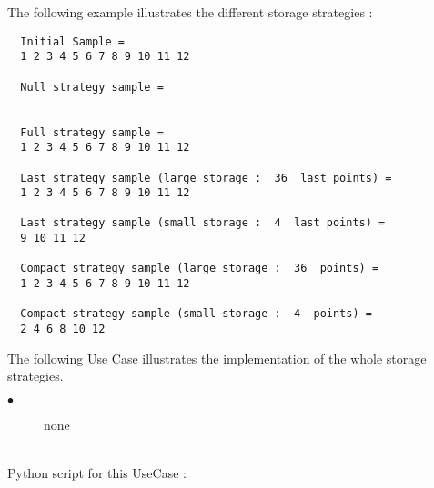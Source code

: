 The following example illustrates the different storage strategies :

\begin{verbatim}
  Initial Sample =
  1 2 3 4 5 6 7 8 9 10 11 12

  Null strategy sample =


  Full strategy sample =
  1 2 3 4 5 6 7 8 9 10 11 12

  Last strategy sample (large storage :  36  last points) =
  1 2 3 4 5 6 7 8 9 10 11 12

  Last strategy sample (small storage :  4  last points) =
  9 10 11 12

  Compact strategy sample (large storage :  36  points) =
  1 2 3 4 5 6 7 8 9 10 11 12

  Compact strategy sample (small storage :  4  points) =
  2 4 6 8 10 12
\end{verbatim}

The following Use Case illustrates the implementation of the whole storage strategies.\\

{
  \begin{description}
  \item[$\bullet$]  none
  \end{description}
}

\textspace\\
Python  script for this UseCase :

